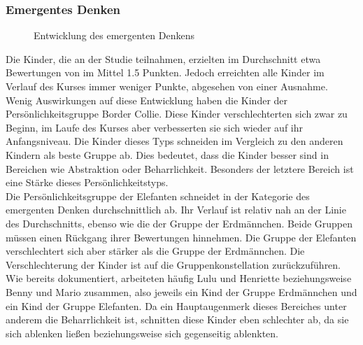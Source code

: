 \subsubsection{Emergentes Denken}
\begin{figure}[H]
	\centering
	\caption{Entwicklung des emergenten Denkens}
\end{figure}	
Die Kinder, die an der Studie teilnahmen, erzielten im Durchschnitt etwa Bewertungen von im Mittel 1.5 Punkten. Jedoch erreichten alle Kinder im Verlauf des Kurses immer weniger Punkte, abgesehen von einer Ausnahme.\\
Wenig Auswirkungen auf diese Entwicklung haben die Kinder der Persönlichkeitsgruppe Border Collie. Diese Kinder verschlechterten sich zwar zu Beginn, im Laufe des Kurses aber verbesserten sie sich wieder auf ihr Anfangsniveau. Die Kinder dieses Typs schneiden im Vergleich zu den anderen Kindern als beste Gruppe ab. Dies bedeutet, dass die Kinder besser sind in Bereichen wie Abstraktion oder Beharrlichkeit. Besonders der letztere Bereich ist eine Stärke dieses Persönlichkeitstyps.\\
Die Persönlichkeitsgruppe der Elefanten schneidet in der Kategorie des emergenten Denken durchschnittlich ab. Ihr Verlauf ist relativ nah an der Linie des Durchschnitts, ebenso wie die der Gruppe der Erdmännchen. Beide Gruppen müssen einen Rückgang ihrer Bewertungen hinnehmen. Die Gruppe der Elefanten verschlechtert sich aber stärker als die Gruppe der Erdmännchen. Die Verschlechterung der Kinder ist auf die Gruppenkonstellation zurückzuführen. Wie bereits dokumentiert, arbeiteten häufig Lulu und Henriette beziehungsweise Benny und Mario zusammen, also jeweils ein Kind der Gruppe Erdmännchen und ein Kind der Gruppe Elefanten. Da ein Hauptaugenmerk dieses Bereiches unter anderem die Beharrlichkeit ist, schnitten diese Kinder eben schlechter ab, da sie sich ablenken ließen beziehungsweise sich gegenseitig ablenkten.\\
